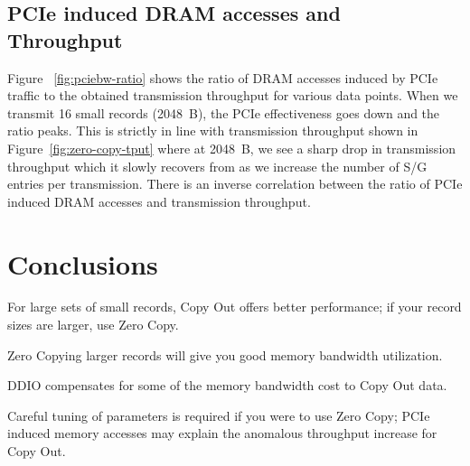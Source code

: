 \subsection{PCIe induced DRAM accesses and Throughput}
Figure ~\ref{fig:pciebw-ratio} shows the ratio of DRAM accesses induced by PCIe traffic to the obtained transmission throughput for various data points. When we transmit 16 small records (2048~B),
the PCIe effectiveness goes down and the ratio peaks. This is strictly in line with transmission throughput shown in Figure~\ref{fig:zero-copy-tput} where at 2048~B, we see a sharp drop in transmission 
throughput which it slowly recovers from as we increase the number of S/G entries per transmission. There is an inverse correlation between the ratio of PCIe induced DRAM accesses and transmission throughput.
\newline


\section{Conclusions}
\begin{myitemize}
\setlength\itemsep{0.5em}
\item For large sets of small records, Copy Out offers better performance; if your record sizes are larger, use Zero Copy.
\item Zero Copying larger records will give you good memory bandwidth utilization.
\item DDIO compensates for some of the memory bandwidth cost to Copy Out data.
\item Careful tuning of parameters is required if you were to use Zero Copy; PCIe induced memory accesses may explain the anomalous throughput increase for Copy Out. 
\end{myitemize}














